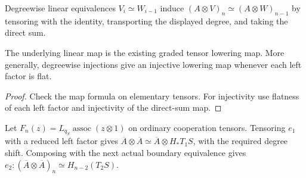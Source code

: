 \begin{definition}
  \label{def:h6-tensor-lowering-equiv}
  \leanok
  Degreewise linear equivalences $V_i\simeq W_{i-1}$ induce
  $(A\otimes V)_n\simeq(A\otimes W)_{n-1}$ by tensoring with the
  identity, transporting the displayed degree, and taking the direct sum.
\end{definition}

\begin{proposition}
  \label{prop:h6-tensor-lowering-equiv}
  \leanok
  The underlying linear map is the existing graded tensor lowering map.
  More generally, degreewise injections give an injective lowering map
  whenever each left factor is flat.
\end{proposition}
\begin{proof}
  Check the map formula on elementary tensors. For injectivity use flatness
  of each left factor and injectivity of the direct-sum map.
  \leanok
\end{proof}

\begin{definition}
  \label{def:h6-double-reduced-boundary-equiv}
  \leanok
  Let $F_n(z)=L_{q_S}\operatorname{assoc}(z\otimes1)$ on ordinary
  cooperation tensors. Tensoring $e_1$ with a reduced left factor gives
  $\overline A\otimes\overline A\simeq\overline A\otimes H_*T_1S$,
  with the required degree shift. Composing with the next actual boundary
  equivalence gives $e_2:(\overline A\otimes\overline A)_n
  \simeq H_{n-2}(T_2S)$.
\end{definition}

